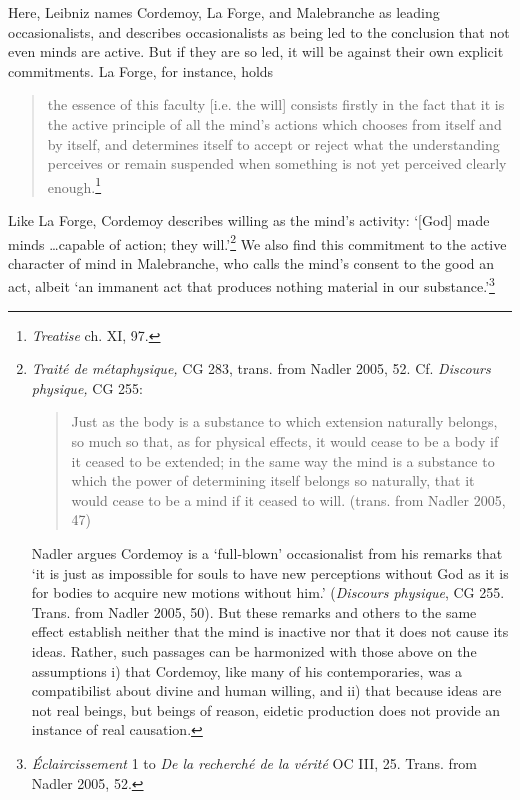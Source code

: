 \documentclass{article}
\begin{document}
Here, Leibniz names Cordemoy, La Forge, and Malebranche as leading
occasionalists, and describes occasionalists as being led to the
conclusion that not even minds are active. But if they are so led, it
will be against their own explicit commitments. La Forge, for instance,
holds

\begin{quote}
the essence of this faculty {[}i.e. the will{]} consists firstly in the
fact that it is the active principle of all the mind's actions which
chooses from itself and by itself, and determines itself to accept or
reject what the understanding perceives or remain suspended when
something is not yet perceived clearly enough.\footnote{\emph{Treatise}
  ch. XI, 97.}
\end{quote}

Like La Forge, Cordemoy describes willing as the mind's activity:
`{[}God{]} made minds \ldots capable of action; they
will.'\footnote{\emph{Traité de métaphysique,} CG 283, trans. from
  Nadler 2005, 52. Cf. \emph{Discours physique,} CG 255:

  \begin{quote}
  Just as the body is a substance to which extension naturally belongs,
  so much so that, as for physical effects, it would cease to be a body
  if it ceased to be extended; in the same way the mind is a substance
  to which the power of determining itself belongs so naturally, that it
  would cease to be a mind if it ceased to will. (trans. from Nadler
  2005, 47)
  \end{quote}

  Nadler argues Cordemoy is a `full-blown' occasionalist from his
  remarks that `it is just as impossible for souls to have new
  perceptions without God as it is for bodies to acquire new motions
  without him.' (\emph{Discours physique}, CG 255. Trans. from Nadler
  2005, 50). But these remarks and others to the same effect establish
  neither that the mind is inactive nor that it does not cause its
  ideas. Rather, such passages can be harmonized with those above on the
  assumptions i) that Cordemoy, like many of his contemporaries, was a
  compatibilist about divine and human willing, and ii) that because
  ideas are not real beings, but beings of reason, eidetic production
  does not provide an instance of real causation.} We also find this
commitment to the active character of mind in Malebranche, who calls the
mind's consent to the good an act, albeit `an immanent act that produces
nothing material in our substance.'\footnote{\emph{Éclaircissement} 1 to
  \emph{De la recherché de la vérité} OC III, 25. Trans. from Nadler
  2005, 52.}
\end{document}

